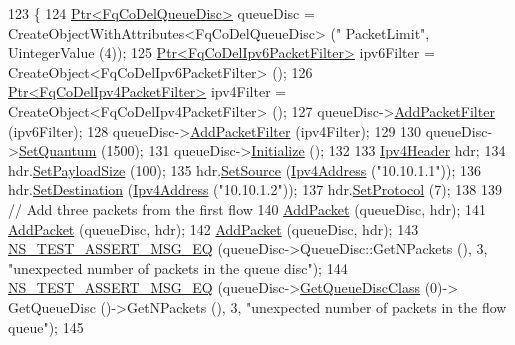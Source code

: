 \begin{DoxyCode}
123 \{
124   \hyperlink{classns3_1_1Ptr}{Ptr<FqCoDelQueueDisc>} queueDisc = CreateObjectWithAttributes<FqCoDelQueueDisc> (\textcolor{stringliteral}{"
      PacketLimit"}, UintegerValue (4));
125   \hyperlink{classns3_1_1Ptr}{Ptr<FqCoDelIpv6PacketFilter>} ipv6Filter = 
      CreateObject<FqCoDelIpv6PacketFilter> ();
126   \hyperlink{classns3_1_1Ptr}{Ptr<FqCoDelIpv4PacketFilter>} ipv4Filter = 
      CreateObject<FqCoDelIpv4PacketFilter> ();
127   queueDisc->\hyperlink{classns3_1_1QueueDisc_a45efdc512f64cb8e0d57ad4f208ed4b7}{AddPacketFilter} (ipv6Filter);
128   queueDisc->\hyperlink{classns3_1_1QueueDisc_a45efdc512f64cb8e0d57ad4f208ed4b7}{AddPacketFilter} (ipv4Filter);
129 
130   queueDisc->\hyperlink{classns3_1_1FqCoDelQueueDisc_a3d7f222490f1df11be26ee4b3f0dfce5}{SetQuantum} (1500);
131   queueDisc->\hyperlink{classns3_1_1Object_af4411cb29971772fcd09203474a95078}{Initialize} ();
132 
133   \hyperlink{classns3_1_1Ipv4Header}{Ipv4Header} hdr;
134   hdr.\hyperlink{classns3_1_1Ipv4Header_a3e961181f7839619a68bb7a2dcd483b0}{SetPayloadSize} (100);
135   hdr.\hyperlink{classns3_1_1Ipv4Header_af3c8c140e302ec4aa1dc885ce1dcc070}{SetSource} (\hyperlink{classns3_1_1Ipv4Address}{Ipv4Address} (\textcolor{stringliteral}{"10.10.1.1"}));
136   hdr.\hyperlink{classns3_1_1Ipv4Header_a154e584fb5418de7a5ce34dbb852de02}{SetDestination} (\hyperlink{classns3_1_1Ipv4Address}{Ipv4Address} (\textcolor{stringliteral}{"10.10.1.2"}));
137   hdr.\hyperlink{classns3_1_1Ipv4Header_aca424df8132b7717fb4c315fcb4ce4bf}{SetProtocol} (7);
138 
139   \textcolor{comment}{// Add three packets from the first flow}
140   \hyperlink{classFqCoDelQueueDiscIPFlowsSeparationAndPacketLimit_abcc442c698eb2bcd3b6cafe34d751297}{AddPacket} (queueDisc, hdr);
141   \hyperlink{classFqCoDelQueueDiscIPFlowsSeparationAndPacketLimit_abcc442c698eb2bcd3b6cafe34d751297}{AddPacket} (queueDisc, hdr);
142   \hyperlink{classFqCoDelQueueDiscIPFlowsSeparationAndPacketLimit_abcc442c698eb2bcd3b6cafe34d751297}{AddPacket} (queueDisc, hdr);
143   \hyperlink{group__testing_ga2a9d78cffb3db8e867c35fff0b698cf5}{NS\_TEST\_ASSERT\_MSG\_EQ} (queueDisc->QueueDisc::GetNPackets (), 3, \textcolor{stringliteral}{"unexpected number
       of packets in the queue disc"});
144   \hyperlink{group__testing_ga2a9d78cffb3db8e867c35fff0b698cf5}{NS\_TEST\_ASSERT\_MSG\_EQ} (queueDisc->\hyperlink{classns3_1_1QueueDisc_a584d228f7bff3f754d32793a38134556}{GetQueueDiscClass} (0)->
      GetQueueDisc ()->GetNPackets (), 3, \textcolor{stringliteral}{"unexpected number of packets in the flow queue"});
145 

\end{DoxyCode}

